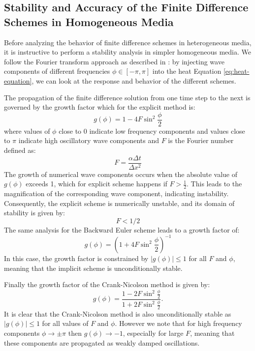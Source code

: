\documentclass[sn-vancouver, Numbered]{sn-jnl}
\begin{document}
\subsection{Stability and Accuracy of the Finite Difference Schemes in Homogeneous Media}
\label{sec:stability}

Before analyzing the behavior of finite difference schemes in heterogeneous media, it is instructive to perform a stability analysis in simpler homogeneous media.
We follow the Fourier transform approach as described in \cite{Pearson1965, Giles1995, Thomas1995, Oesterby2003, Langtangen2017}: by injecting wave components of different frequencies $\phi \in [-\pi, \pi]$ into the heat Equation \ref{eq:heat-equation}, we can look at the response and behavior of the different schemes.

The propagation of the finite difference solution from one time step to the next is governed by the growth factor which for the explicit method is:
\begin{equation}
    g(\phi) = 1 - 4 F \sin^2\dfrac{\phi}{2}
\end{equation}
where values of $\phi$ close to 0 indicate low frequency components and values close to $\pi$ indicate high oscillatory wave components and  $F$ is the Fourier number defined as: 
\begin{equation}
    F = \dfrac{\alpha \Delta t }{ \Delta x^2}
\end{equation}
The growth of numerical wave components occurs when the absolute value of $g(\phi)$ exceeds 1,  which for explicit scheme happens if $F > \frac{1}{2}$. This leads to the magnification of the corresponding wave component, indicating instability.
Consequently, the explicit scheme is numerically unstable, and its domain of stability is given by:
\begin{equation}
   F < 1/2 
\end{equation}
The same analysis for the Backward Euler scheme leads to a growth factor of:
\begin{equation}
    g(\phi) = \left( 1 + 4 F \sin^2 \dfrac{\phi}{2}   \right)^{-1}
\end{equation}
In this case, the growth factor is constrained by $\left| g(\phi) \right| \le 1$ for all $F$ and $\phi$, meaning that the implicit scheme is unconditionally stable.

Finally the growth factor of the Crank-Nicolson method is given by: 
\begin{equation}
    g(\phi) = \dfrac{1- 2 F \sin^2 \frac{\phi}{2}}{1+2F \sin^2 \frac{\phi}{2}}.
\end{equation}
It is clear that the Crank-Nicolson method is also unconditionally stable as $\left| g(\phi) \right| \le 1$ for all values of $F$ and $\phi$.
However we note that for high frequency components $\phi \to  \pm \pi$ then $g(\phi) \to -1$, especially for large $F$, meaning that these components are propagated as weakly damped oscillations.
\end{document}
